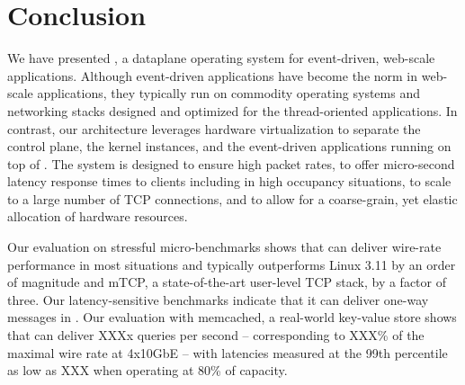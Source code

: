 
\section{Conclusion}

We have presented \ix, a dataplane operating system for event-driven,
web-scale applications.  Although event-driven applications have
become the norm in web-scale applications, they typically run on
commodity operating systems and networking stacks designed and
optimized for the thread-oriented applications.  In contrast, our
architecture leverages hardware virtualization to separate the control
plane, the \ix kernel instances, and the event-driven applications
running on top of \ix.  The system is designed to ensure high packet
rates, to offer micro-second latency response times to clients
including in high occupancy situations, to scale to a large number of 
TCP connections, and to allow for a coarse-grain, yet
elastic allocation of hardware resources.

Our evaluation on stressful micro-benchmarks shows that \ix can
deliver wire-rate performance in most situations and typically
outperforms Linux 3.11 by an order of magnitude and mTCP, a
state-of-the-art user-level TCP stack, by a factor of three.  Our
latency-sensitive benchmarks indicate that it can deliver one-way
messages in \microsecond.  Our evaluation with memcached, a
real-world key-value store shows that \ix can deliver XXXx queries per
second -- corresponding to XXX\% of the maximal wire rate at 4x10GbE -- with
latencies measured at the 99th percentile as low as XXX when operating
at 80\% of capacity. 


